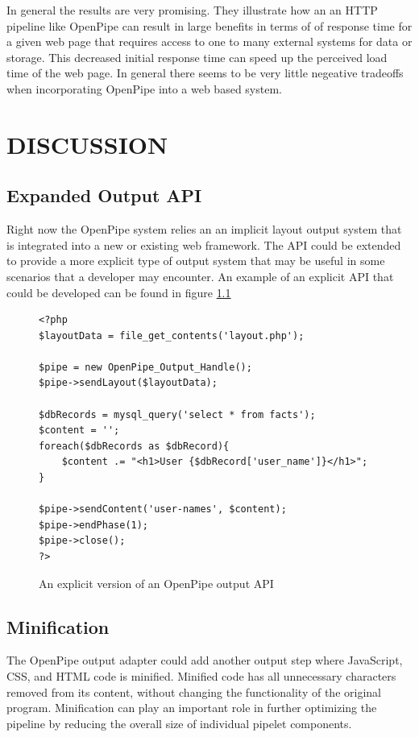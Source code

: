 \documentclass[12pt]{report}
\begin{document}
In general the results are very promising.  They illustrate how an an HTTP pipeline like OpenPipe can result in large benefits in terms of of response time for a given web page that requires access to one to many external systems for data or storage. This decreased initial response time can speed up the perceived load time of the web page. In general there seems to be very little negeative tradeoffs when incorporating OpenPipe into a web based system.

\chapter{DISCUSSION}

\section{Expanded Output API}

Right now the OpenPipe system relies an an implicit layout output system that is integrated into a new or existing web framework. The API could be extended to provide a more explicit type of output system that may be useful in some scenarios that a developer may encounter. An example of an explicit API that could  be developed can be found in figure \ref{fig:explicitApi}

\begin{figure}[H]
\label{fig:explicitApi}
\begin{lstlisting}
<?php
$layoutData = file_get_contents('layout.php');

$pipe = new OpenPipe_Output_Handle();
$pipe->sendLayout($layoutData);

$dbRecords = mysql_query('select * from facts');
$content = '';
foreach($dbRecords as $dbRecord){
	$content .= "<h1>User {$dbRecord['user_name']}</h1>";
}

$pipe->sendContent('user-names', $content);
$pipe->endPhase(1);
$pipe->close();
?>
\end{lstlisting}
\caption{An explicit version of an OpenPipe output API}
\end{figure}

\section{Minification}
The OpenPipe output adapter could add another output step where JavaScript, CSS, and HTML code is minified. Minified code has all unnecessary characters removed from its content, without changing the functionality of the original program. Minification can play an important role in further optimizing the pipeline by reducing the overall size of individual pipelet components.
\end{document}
